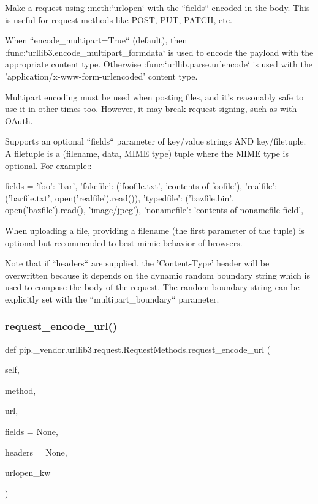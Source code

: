 \begin{DoxyVerb}Make a request using :meth:`urlopen` with the ``fields`` encoded in
the body. This is useful for request methods like POST, PUT, PATCH, etc.

When ``encode_multipart=True`` (default), then
:func:`urllib3.encode_multipart_formdata` is used to encode
the payload with the appropriate content type. Otherwise
:func:`urllib.parse.urlencode` is used with the
'application/x-www-form-urlencoded' content type.

Multipart encoding must be used when posting files, and it's reasonably
safe to use it in other times too. However, it may break request
signing, such as with OAuth.

Supports an optional ``fields`` parameter of key/value strings AND
key/filetuple. A filetuple is a (filename, data, MIME type) tuple where
the MIME type is optional. For example::

    fields = {
'foo': 'bar',
'fakefile': ('foofile.txt', 'contents of foofile'),
'realfile': ('barfile.txt', open('realfile').read()),
'typedfile': ('bazfile.bin', open('bazfile').read(),
              'image/jpeg'),
'nonamefile': 'contents of nonamefile field',
    }

When uploading a file, providing a filename (the first parameter of the
tuple) is optional but recommended to best mimic behavior of browsers.

Note that if ``headers`` are supplied, the 'Content-Type' header will
be overwritten because it depends on the dynamic random boundary string
which is used to compose the body of the request. The random boundary
string can be explicitly set with the ``multipart_boundary`` parameter.
\end{DoxyVerb}
 \mbox{\label{classpip_1_1__vendor_1_1urllib3_1_1request_1_1RequestMethods_a76a39f9471397ef9b0fb79b6ea5d4bf4}} 
\subsubsection{\texorpdfstring{request\+\_\+encode\+\_\+url()}{request\_encode\_url()}}
{\footnotesize\ttfamily def pip.\+\_\+vendor.\+urllib3.\+request.\+Request\+Methods.\+request\+\_\+encode\+\_\+url (\begin{DoxyParamCaption}\item[{}]{self,  }\item[{}]{method,  }\item[{}]{url,  }\item[{}]{fields = {\ttfamily None},  }\item[{}]{headers = {\ttfamily None},  }\item[{}]{urlopen\+\_\+kw }\end{DoxyParamCaption})}

